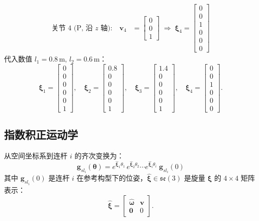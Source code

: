 \documentclass[12pt,a4paper]{ctexart}
\begin{document}
\begin{conceptbox}[关节旋量 $\bm{\xi}_i$]
\begin{align*}
\text{关节 4 (P, 沿 $z$ 轴):}\quad
  \mathbf{v}_4 &= \begin{bmatrix}0\\0\\1\end{bmatrix}
  \;\Rightarrow\; \bm{\xi}_4 = \begin{bmatrix}0\\0\\1\\0\\0\\0\end{bmatrix}
\end{align*}
代入数值 $l_1 = 0.8$\,m, $l_2 = 0.6$\,m：
\[
\bm{\xi}_1 = \begin{bmatrix}0\\0\\0\\0\\0\\1\end{bmatrix},\quad
\bm{\xi}_2 = \begin{bmatrix}0.8\\0\\0\\0\\0\\1\end{bmatrix},\quad
\bm{\xi}_3 = \begin{bmatrix}1.4\\0\\0\\0\\0\\1\end{bmatrix},\quad
\bm{\xi}_4 = \begin{bmatrix}0\\0\\1\\0\\0\\0\end{bmatrix}.
\]
\end{conceptbox}

\subsection{指数积正运动学}

从空间坐标系到连杆 $i$ 的齐次变换为：
\[
\mathbf{g}_{sl_i}(\bm{\theta}) = e^{\hat{\bm{\xi}}_1\theta_1}\,e^{\hat{\bm{\xi}}_2\theta_2}\cdots e^{\hat{\bm{\xi}}_i\theta_i}\;\mathbf{g}_{sl_i}(0)
\]
其中 $\mathbf{g}_{sl_i}(0)$ 是连杆 $i$ 在参考构型下的位姿，$\hat{\bm{\xi}} \in \mathfrak{se}(3)$ 是旋量 $\bm{\xi}$ 的 $4\times4$ 矩阵表示：
\[
\hat{\bm{\xi}} = \begin{bmatrix} \hat{\bm{\omega}} & \mathbf{v} \\ \mathbf{0} & 0 \end{bmatrix}.
\]
\end{document}
